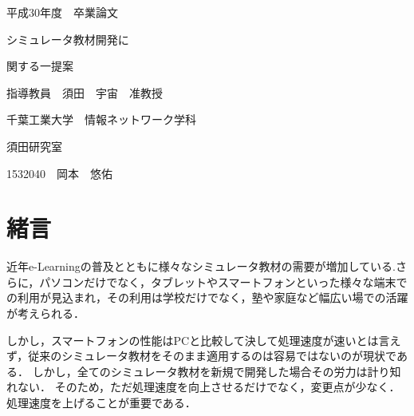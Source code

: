 \documentclass[a4j,12pt]{jsarticle}
\begin{document}
\begin{titlepage}
\begin{center}
\begin{LARGE}
平成30年度　卒業論文
\end{LARGE}

\vspace{20mm}
\begin{Huge}
シミュレータ教材開発に

関する一提案
\end{Huge}

\vspace{40mm}
\begin{LARGE}
指導教員　須田　宇宙　准教授


\vspace{15mm}
千葉工業大学　情報ネットワーク学科

須田研究室

\vspace{20mm}
1532040　岡本　悠佑
\end{LARGE}
\end{center}


\vspace{35mm}
\begin{LARGE}
 \end{LARGE}
 
\end{titlepage}
\newpage


\setcounter{page}{1} %
\setcounter{tocdepth}{3}
\tableofcontents
\clearpage
\listoffigures
\clearpage
\listoftables
\clearpage

\newpage
{}
\setcounter{page}{1} 
\section{緒言}
近年e-Learningの普及とともに様々なシミュレータ教材の需要が増加している.さらに，パソコンだけでなく，タブレットやスマートフォンといった様々な端末での利用が見込まれ，その利用は学校だけでなく，塾や家庭など幅広い場での活躍が考えられる．

しかし，スマートフォンの性能はPCと比較して決して処理速度が速いとは言えず，従来のシミュレータ教材をそのまま適用するのは容易ではないのが現状である．
しかし，全てのシミュレータ教材を新規で開発した場合その労力は計り知れない．
そのため，ただ処理速度を向上させるだけでなく，変更点が少なく．処理速度を上げることが重要である．
\end{document}
